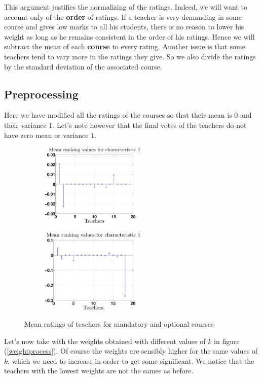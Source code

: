 \documentclass[12pt,a4paper]{article}
\begin{document}
This argument justifies the normalizing of the ratings. Indeed, we will want to account only of the \textbf{order} of ratings. If a teacher is very demanding in some course and gives low marks to all his students, there is no reason to lower his weight as long as he remains consistent in the order of his ratings. Hence we will subtract the mean of each \textbf{course} to every rating. Another issue is that some teachers tend to vary more in the ratings they give. So we also divide the ratings by the standard deviation of the associated course.
\FloatBarrier

\subsection*{Preprocessing}
Here we have modified all the ratings of the courses so that their mean is 0 and their variance 1. Let's note however that the final votes of the teachers do not have zero mean or variance 1.

\begin{figure}
\centering
\begin{subfigure}[b]{0.49\textwidth}
\includegraphics[width = 5cm]{preprocess/ppmeanTeachersC1.eps}
\end{subfigure}
\begin{subfigure}[b]{0.49\textwidth}
\includegraphics[width = 5cm]{preprocess/ppmeanTeachersC2.eps}
\end{subfigure}
\caption{Mean ratings of teachers for mandatory and optional courses}
\end{figure}
Let's now take with the weights obtained with different values of $k$ in figure (\ref{weightprocess}). Of course the weights are sensibly higher for the same values of $k$, which we need to increase in order to get some significant. We notice that the teachers with the lowest weights are not the sames as before.
\end{document}
